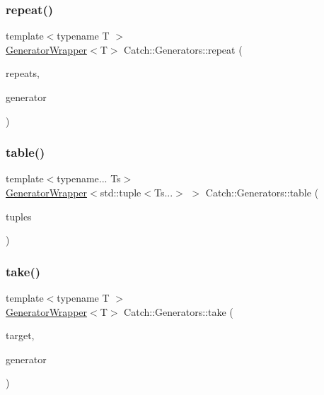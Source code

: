 \mbox{\label{namespace_catch_1_1_generators_a3a30dce0fd8e3818baaca086ba5fd35a}} 
\subsubsection{\texorpdfstring{repeat()}{repeat()}}
{\footnotesize\ttfamily template$<$typename T $>$ \\
\mbox{\hyperlink{class_catch_1_1_generators_1_1_generator_wrapper}{Generator\+Wrapper}}$<$T$>$ Catch\+::\+Generators\+::repeat (\begin{DoxyParamCaption}\item[{size\+\_\+t}]{repeats,  }\item[{\mbox{\hyperlink{class_catch_1_1_generators_1_1_generator_wrapper}{Generator\+Wrapper}}$<$ T $>$ \&\&}]{generator }\end{DoxyParamCaption})}

\mbox{\label{namespace_catch_1_1_generators_a6e0436ad4eddeabdc34281119201dbfe}} 
\subsubsection{\texorpdfstring{table()}{table()}}
{\footnotesize\ttfamily template$<$typename... Ts$>$ \\
\mbox{\hyperlink{class_catch_1_1_generators_1_1_generator_wrapper}{Generator\+Wrapper}}$<$std\+::tuple$<$Ts...$>$ $>$ Catch\+::\+Generators\+::table (\begin{DoxyParamCaption}\item[{std\+::initializer\+\_\+list$<$ std\+::tuple$<$ typename std\+::decay$<$ Ts $>$\+::type... $>$$>$}]{tuples }\end{DoxyParamCaption})}

\mbox{\label{namespace_catch_1_1_generators_a972480864d60131946f6f53c566de070}} 
\subsubsection{\texorpdfstring{take()}{take()}}
{\footnotesize\ttfamily template$<$typename T $>$ \\
\mbox{\hyperlink{class_catch_1_1_generators_1_1_generator_wrapper}{Generator\+Wrapper}}$<$T$>$ Catch\+::\+Generators\+::take (\begin{DoxyParamCaption}\item[{size\+\_\+t}]{target,  }\item[{\mbox{\hyperlink{class_catch_1_1_generators_1_1_generator_wrapper}{Generator\+Wrapper}}$<$ T $>$ \&\&}]{generator }\end{DoxyParamCaption})}

